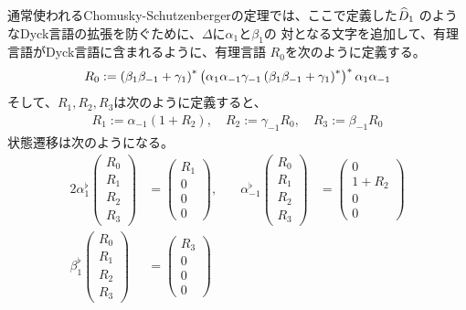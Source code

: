 {	通常使われるChomusky-Schutzenbergerの定理では、ここで定義した$\widehat{D}_1$
	のようなDyck言語の拡張を防ぐために、$\Delta$に$\alpha_1$と$\beta_1$の
	対となる文字を追加して、有理言語がDyck言語に含まれるように、有理言語
	$R_0$を次のように定義する。
	\begin{equation*}\begin{split}
		R_0 &:= \left({\beta_1\beta_{-1} + \gamma_1}\right)^*
			\left({\alpha_1\alpha_{-1}\gamma_{-1}\left({\beta_1\beta_{-1} 
			+ \gamma_1}\right)^*}\right)^*\alpha_1\alpha_{-1} \\
	\end{split}\end{equation*}
	そして、$R_1,R_2,R_3$は次のように定義すると、
	\begin{equation*}\begin{split}
		R_1 := \alpha_{-1}(1 + R_2),\quad R_2 := \gamma_{-1}R_0
		,\quad R_3 := \beta_{-1}R_0
	\end{split}\end{equation*}
	状態遷移は次のようになる。
	\begin{alignat*}{2}
		\alpha_1^\flat \begin{pmatrix}
			R_0 \\ R_1 \\ R_2 \\ R_3
		\end{pmatrix} &= \begin{pmatrix}
			R_1 \\ 0 \\ 0 \\ 0
		\end{pmatrix}, &\quad \alpha_{-1}^\flat\begin{pmatrix}
			R_0 \\ R_1 \\ R_2 \\ R_3
		\end{pmatrix} &= \begin{pmatrix}
			0 \\ 1 + R_2 \\ 0 \\ 0
		\end{pmatrix} \\
		\beta_1^\flat\begin{pmatrix}
			R_0 \\ R_1 \\ R_2 \\ R_3
		\end{pmatrix} &= \begin{pmatrix}
			R_3 \\ 0 \\ 0 \\ 0

\end{pmatrix}
\end{alignat*}}
